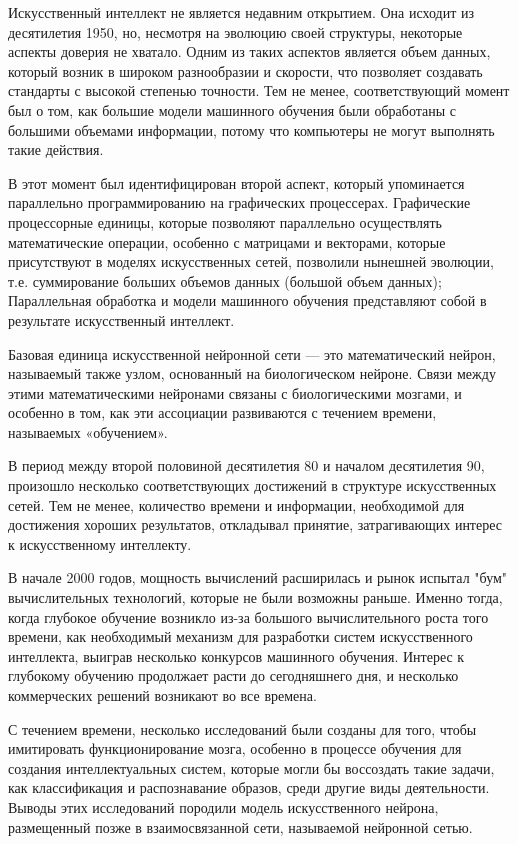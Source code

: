 Искусственный интеллект не является недавним открытием.
Она исходит из десятилетия 1950, но,
несмотря на эволюцию своей структуры,
некоторые аспекты доверия не хватало.
Одним из таких аспектов является объем данных,
который возник в широком разнообразии и скорости,
что позволяет создавать стандарты с высокой степенью точности.
Тем не менее, соответствующий момент был о том,
как большие модели машинного обучения были обработаны с большими объемами информации,
потому что компьютеры не могут выполнять такие действия.

В этот момент был идентифицирован второй аспект,
который упоминается параллельно программированию на графических процессерах.
Графические процессорные единицы,
которые позволяют параллельно осуществлять математические операции,
особенно с матрицами и векторами,
которые присутствуют в моделях искусственных сетей,
позволили нынешней эволюции,
т.е. суммирование больших объемов данных (большой объем данных);
Параллельная обработка и модели машинного обучения
представляют собой в результате искусственный интеллект.

Базовая единица искусственной нейронной сети — это математический нейрон, называемый также узлом,
основанный на биологическом нейроне. Связи между этими математическими нейронами связаны с биологическими мозгами,
и особенно в том, как эти ассоциации развиваются с течением времени, называемых «обучением».

В период между второй половиной десятилетия 80 и началом десятилетия 90,
произошло несколько соответствующих достижений в структуре искусственных сетей.
Тем не менее, количество времени и информации, необходимой для достижения хороших результатов,
откладывал принятие, затрагивающих интерес к искусственному интеллекту.

В начале 2000 годов, мощность вычислений расширилась и рынок испытал "бум" вычислительных технологий, которые не были возможны раньше.
Именно тогда, когда глубокое обучение возникло из-за большого вычислительного роста того времени,
как необходимый механизм для разработки систем искусственного интеллекта, выиграв несколько конкурсов машинного обучения.
Интерес к глубокому обучению продолжает расти до сегодняшнего дня, и несколько коммерческих решений возникают во все времена.

С течением времени, несколько исследований были созданы для того, чтобы имитировать функционирование мозга,
особенно в процессе обучения для создания интеллектуальных систем,
которые могли бы воссоздать такие задачи, как классификация и распознавание образов, среди другие виды деятельности.
Выводы этих исследований породили модель искусственного нейрона, размещенный позже в взаимосвязанной сети, называемой нейронной сетью.

